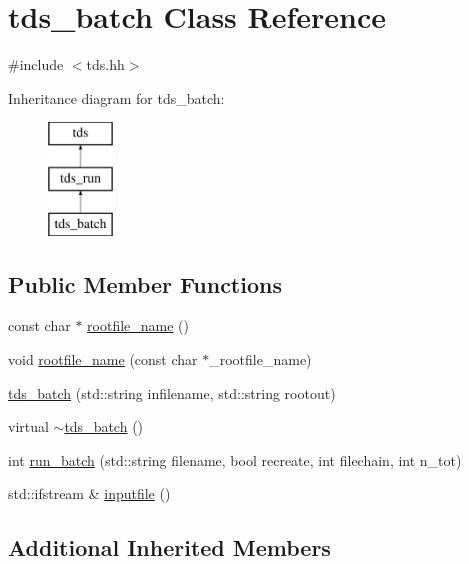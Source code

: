 \hypertarget{classtds__batch}{}\section{tds\+\_\+batch Class Reference}
\label{classtds__batch}


{\ttfamily \#include $<$tds.\+hh$>$}

Inheritance diagram for tds\+\_\+batch\+:\begin{figure}[H]
\begin{center}
\leavevmode
\includegraphics[height=3.000000cm]{classtds__batch}
\end{center}
\end{figure}
\subsection*{Public Member Functions}
\begin{DoxyCompactItemize}
\item 
const char $\ast$ \hyperlink{classtds__batch_a533f64d3586463fb312067fd6902ce17}{rootfile\+\_\+name} ()
\item 
void \hyperlink{classtds__batch_aae27181ea44e97326104535caa34e7e2}{rootfile\+\_\+name} (const char $\ast$\+\_\+rootfile\+\_\+name)
\item 
\hyperlink{classtds__batch_aecd07d1070c0251d5430f17e9ec8b054}{tds\+\_\+batch} (std\+::string infilename, std\+::string rootout)
\item 
virtual \hyperlink{classtds__batch_a198490ee52ed40c59a361f8d86719d72}{$\sim$tds\+\_\+batch} ()
\item 
int \hyperlink{classtds__batch_a09ee988181f4f1b6f2edefced8e617a1}{run\+\_\+batch} (std\+::string filename, bool recreate, int filechain, int n\+\_\+tot)
\item 
std\+::ifstream \& \hyperlink{classtds__batch_a2c311198f8c204dcba09aa413725a895}{inputfile} ()
\end{DoxyCompactItemize}
\subsection*{Additional Inherited Members}


